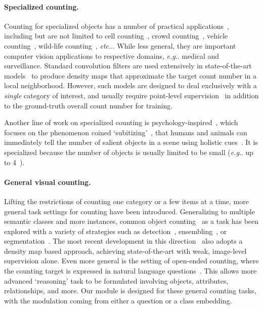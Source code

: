 \documentclass{article} \usepackage[dvipsnames,table]{xcolor}
\makeatletter
\def\vs{{\bm{s}}}
\DeclareRobustCommand\onedot{\futurelet\@let@token\@onedot}
\def\@onedot{\ifx\@let@token.\else.\null\fi\xspace}
\def\eg{\emph{e.g}\onedot} \def\Eg{\emph{E.g}\onedot}
\def\etc{\emph{etc}\onedot} \def\vs{\emph{vs}\onedot}
\makeatother
\begin{document}
\paragraph{Specialized counting.} Counting for specialized objects has a number of practical applications~\cite{marsden2018people}, including but are not limited to cell counting~\cite{xie2018microscopy}, crowd counting~\cite{sindagi2017survey}, vehicle counting~\cite{onoro2016towards}, wild-life counting~\cite{arteta2016counting}, \etc. While less general, they are important computer vision applications to respective domains, \eg medical and surveillance. Standard convolution filters are used extensively in state-of-the-art models~\cite{cheng2019learning} to produce density maps that approximate the target count number in a local neighborhood. However, such models are designed to deal exclusively with a \emph{single} category of interest, and usually require point-level supervision~\cite{sindagi2017survey} in addition to the ground-truth overall count number for training. 

Another line of work on specialized counting is psychology-inspired~\cite{cutini2012subitizing}, which focuses on the phenomenon coined `subitizing'~\cite{kaufman1949discrimination}, that humans and animals can immediately tell the number of salient objects in a scene using holistic cues~\cite{zhang2015salient}. It is specialized because the number of objects is usually limited to be small (\eg up to 4~\cite{zhang2015salient}).

\paragraph{General visual counting.} Lifting the restrictions of counting one category or a few items at a time, more general task settings for counting have been introduced. Generalizing to multiple semantic classes and more instances, common object counting~\cite{chattopadhyay2017counting} as a task has been explored with a variety of strategies such as detection~\cite{ren2015faster}, ensembling~\cite{galton1907one}, or segmentation~\cite{laradji2018blobs}. The most recent development in this direction~\cite{cholakkal2019object} also adopts a density map based approach, achieving state-of-the-art with weak, image-level supervision alone. Even more general is the setting of open-ended counting, where the counting target is expressed in natural language questions~\cite{acharya2019tallyqa}. This allows more advanced `reasoning' task to be formulated involving objects, attributes, relationships, and more. Our module is designed for these general counting tasks, with the modulation coming from either a question or a class embedding.
\end{document}
